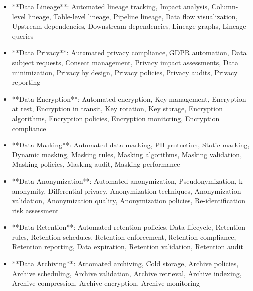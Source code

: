\documentclass[11pt,a4paper]{article}
\begin{document}
\begin{itemize}
\item **Data Lineage**: Automated lineage tracking, Impact analysis, Column-level lineage, Table-level lineage, Pipeline lineage, Data flow visualization, Upstream dependencies, Downstream dependencies, Lineage graphs, Lineage queries
\end{itemize}

\begin{itemize}
\item **Data Privacy**: Automated privacy compliance, GDPR automation, Data subject requests, Consent management, Privacy impact assessments, Data minimization, Privacy by design, Privacy policies, Privacy audits, Privacy reporting
\end{itemize}

\begin{itemize}
\item **Data Encryption**: Automated encryption, Key management, Encryption at rest, Encryption in transit, Key rotation, Key storage, Encryption algorithms, Encryption policies, Encryption monitoring, Encryption compliance
\end{itemize}

\begin{itemize}
\item **Data Masking**: Automated data masking, PII protection, Static masking, Dynamic masking, Masking rules, Masking algorithms, Masking validation, Masking policies, Masking audit, Masking performance
\end{itemize}

\begin{itemize}
\item **Data Anonymization**: Automated anonymization, Pseudonymization, k-anonymity, Differential privacy, Anonymization techniques, Anonymization validation, Anonymization quality, Anonymization policies, Re-identification risk assessment
\end{itemize}

\begin{itemize}
\item **Data Retention**: Automated retention policies, Data lifecycle, Retention rules, Retention schedules, Retention enforcement, Retention compliance, Retention reporting, Data expiration, Retention validation, Retention audit
\end{itemize}

\begin{itemize}
\item **Data Archiving**: Automated archiving, Cold storage, Archive policies, Archive scheduling, Archive validation, Archive retrieval, Archive indexing, Archive compression, Archive encryption, Archive monitoring
\end{itemize}
\end{document}

